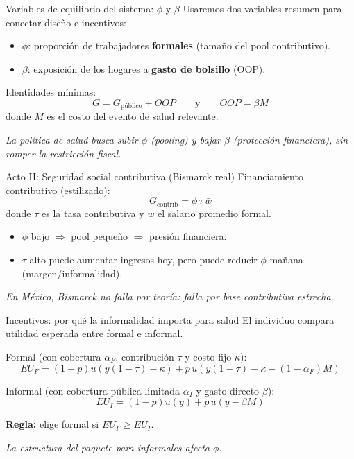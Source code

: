 \documentclass[10pt]{beamer}
\begin{document}
\begin{frame}{Variables de equilibrio del sistema: \(\phi\) y \(\beta\)}
Usaremos dos variables resumen para conectar diseño e incentivos:

\bigskip
\begin{itemize}
  \item \(\phi\): proporción de trabajadores \textbf{formales} (tamaño del pool contributivo).
  \item \(\beta\): exposición de los hogares a \textbf{gasto de bolsillo} (OOP).
\end{itemize}

\bigskip
Identidades mínimas:
\[
G = G_{\text{público}} + OOP
\qquad\text{y}\qquad
OOP = \beta M
\]
donde \(M\) es el costo del evento de salud relevante.

\bigskip
\emph{La política de salud busca subir \(\phi\) (pooling) y bajar \(\beta\) (protección financiera), sin romper la restricción fiscal.}
\end{frame}


\begin{frame}{Acto II: Seguridad social contributiva (Bismarck real)}
Financiamiento contributivo (estilizado):
\[
G_{\text{contrib}} = \phi \,\tau\, \bar w
\]
donde \(\tau\) es la tasa contributiva y \(\bar w\) el salario promedio formal.

\bigskip
\begin{itemize}
  \item \(\phi\) bajo \(\Rightarrow\) pool pequeño \(\Rightarrow\) presión financiera.
  \item \(\tau\) alto puede aumentar ingresos hoy, pero puede reducir \(\phi\) mañana (margen/informalidad).
\end{itemize}

\bigskip
\emph{En México, Bismarck no falla por teoría: falla por base contributiva estrecha.}
\end{frame}

\begin{frame}{Incentivos: por qué la informalidad importa para salud}
El individuo compara utilidad esperada entre formal e informal.

Formal (con cobertura \(\alpha_F\), contribución \(\tau\) y costo fijo \(\kappa\)):
\[
EU_F=(1-p)u(y(1-\tau)-\kappa)+p\,u(y(1-\tau)-\kappa-(1-\alpha_F)M)
\]

Informal (con cobertura pública limitada \(\alpha_I\) y gasto directo \(\beta\)):
\[
EU_I=(1-p)u(y)+p\,u(y-\beta M)
\]

\bigskip
\textbf{Regla:} elige formal si \(EU_F \ge EU_I\).

\bigskip
\emph{La estructura del paquete para informales afecta \(\phi\).}
\end{frame}
\end{document}
